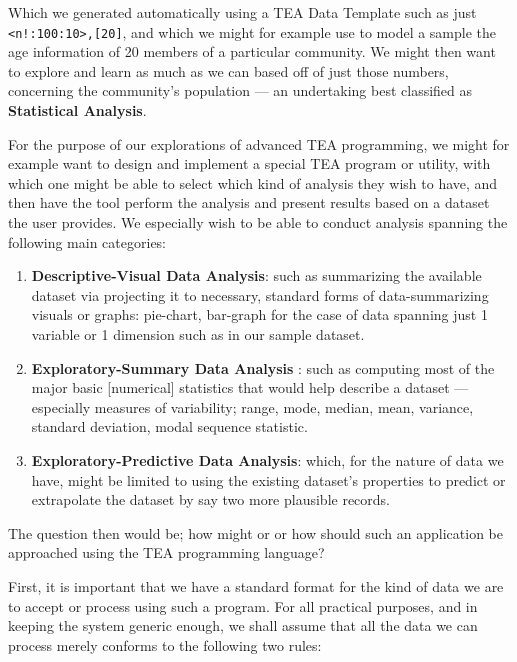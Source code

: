 \documentclass[a4paper, 18pt]{book} %
\begin{document}
  
  Which we generated automatically using a TEA Data Template such as just \texttt{<n!:100:10>,[20]}, and which we might for example use to model a sample the age information of 20 members of a particular community. We might then want to explore and learn as much as we can based off of just those numbers, concerning the community's population --- an undertaking best classified as \textbf{Statistical Analysis}.


\vspace{2em}

For the purpose of our explorations of advanced TEA programming, we might for example want to design and implement a special TEA program or utility, with which one might be able to select which kind of analysis they wish to have, and then have the tool perform the analysis and present results based on a dataset the user provides. We especially wish to be able to conduct analysis spanning the following main categories:

\begin{enumerate}
\item \textbf{Descriptive-Visual Data Analysis}: such as summarizing the available dataset via projecting it to necessary, standard forms of data-summarizing visuals or graphs: pie-chart, bar-graph for the case of data spanning just 1 variable or 1 dimension such as in our sample dataset.
\item \textbf{Exploratory-Summary Data Analysis} : such as computing most of the major basic [numerical] statistics that would help describe a dataset --- especially measures of variability\cite{transformatics}; range, mode, median, mean, variance, standard deviation, modal sequence statistic.
\item \textbf{Exploratory-Predictive Data Analysis}: which, for the nature of data we have, might be limited to using the existing dataset's properties to predict or extrapolate the dataset by say two more plausible records.
\end{enumerate} 


\vspace{2em}

The question then would be; how might or or how should such an application be approached using the TEA programming language?


\vspace{2em}

First, it is important that we have a standard format for the kind of data we are to accept or process using such a program. For all practical purposes, and in keeping the system generic enough, we shall assume that all the data we can process merely conforms to the following two rules:
\end{document}
